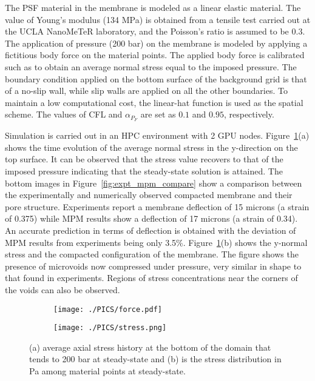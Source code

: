 The PSF material in the membrane is modeled as a linear elastic material. The value of Young's modulus (134 MPa) is obtained from a tensile test carried out at the UCLA NanoMeTeR laboratory, and the Poisson's ratio is assumed to be $0.3$. The application of pressure (200 bar) on the membrane is modeled by applying a fictitious body force on the material points. The applied body force is calibrated such as to obtain an average normal stress equal to the imposed pressure. The boundary condition applied on the bottom surface of the background grid is that of a no-slip wall, while slip walls are applied on all the other boundaries. To maintain a low computational cost, the linear-hat function is used as the spatial scheme. The values of CFL and $\alpha_{P_F}$ are set as $0.1$ and $0.95$, respectively.


%
Simulation is carried out in an HPC environment with 2 GPU nodes. Figure~\ref{fig:stress}(a) shows the time evolution of the average normal stress in the y-direction on the top surface. It can be observed that the stress value recovers to  that of the imposed pressure indicating that the steady-state solution is attained. The bottom images in Figure~\ref{fig:expt_mpm_compare} show a comparison between the experimentally and numerically observed compacted membrane and their pore structure. Experiments report a membrane deflection of 15 microns (a strain of 0.375) while MPM results show a deflection of 17 microns (a strain of 0.34). An accurate prediction in terms of deflection is obtained with the deviation of MPM results from experiments being only 3.5\%. Figure~\ref{fig:stress}(b) shows the y-normal stress and the compacted configuration of the membrane. The figure shows the presence of microvoids now compressed under pressure, very similar in shape to that found in experiments. Regions of stress concentrations near the corners of the voids can also be observed.

\begin{figure}[tbh]
\centering
\begin{subfigure}[b]{0.49\textwidth}
    \texttt{[image: ./PICS/force.pdf]}
    \caption{}
\end{subfigure}
\begin{subfigure}[b]{0.49\textwidth}
    \texttt{[image: ./PICS/stress.png]}
    \caption{}
\end{subfigure}
\caption{(a) average axial stress history at the bottom of the domain that tends to 200 bar at steady-state and (b) is the stress distribution in Pa among material points at steady-state.}
\label{fig:stress} 
\end{figure}